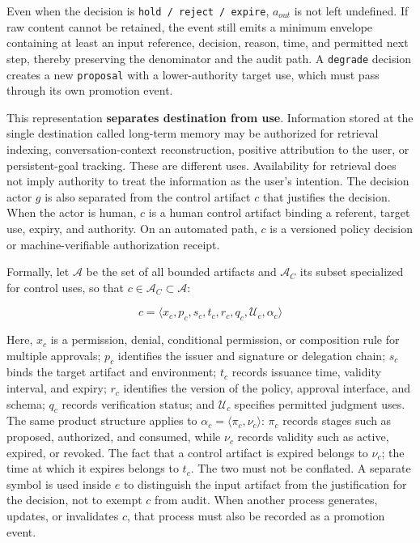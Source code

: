 Even when the decision is \passthrough{\lstinline!hold / reject / expire!}, \(a_{out}\) is not left undefined. If raw content cannot be retained, the event still emits a minimum envelope containing at least an input reference, decision, reason, time, and permitted next step, thereby preserving the denominator and the audit path. A \passthrough{\lstinline!degrade!} decision creates a new \passthrough{\lstinline!proposal!} with a lower-authority target use, which must pass through its own promotion event.

This representation \textbf{separates destination from use}. Information stored at the single destination called long-term memory may be authorized for retrieval indexing, conversation-context reconstruction, positive attribution to the user, or persistent-goal tracking. These are different uses. Availability for retrieval does not imply authority to treat the information as the user's intention. The decision actor \(g\) is also separated from the control artifact \(c\) that justifies the decision. When the actor is human, \(c\) is a human control artifact binding a referent, target use, expiry, and authority. On an automated path, \(c\) is a versioned policy decision or machine-verifiable authorization receipt.

Formally, let \(\mathcal A\) be the set of all bounded artifacts and \(\mathcal A_C\) its subset specialized for control uses, so that \(c\in\mathcal A_C\subset\mathcal A\):

\[
c=\langle x_c,p_c,s_c,t_c,r_c,q_c,\mathcal U_c,\alpha_c\rangle
\]

Here, \(x_c\) is a permission, denial, conditional permission, or composition rule for multiple approvals; \(p_c\) identifies the issuer and signature or delegation chain; \(s_c\) binds the target artifact and environment; \(t_c\) records issuance time, validity interval, and expiry; \(r_c\) identifies the version of the policy, approval interface, and schema; \(q_c\) records verification status; and \(\mathcal U_c\) specifies permitted judgment uses. The same product structure applies to \(\alpha_c=\langle\pi_c,\nu_c\rangle\): \(\pi_c\) records stages such as proposed, authorized, and consumed, while \(\nu_c\) records validity such as active, expired, or revoked. The fact that a control artifact is expired belongs to \(\nu_c\); the time at which it expires belongs to \(t_c\). The two must not be conflated. A separate symbol is used inside \(e\) to distinguish the input artifact from the justification for the decision, not to exempt \(c\) from audit. When another process generates, updates, or invalidates \(c\), that process must also be recorded as a promotion event.

